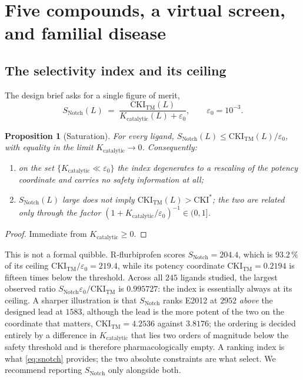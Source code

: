 \documentclass[11pt,reqno]{amsart}
\theoremstyle{plain}
\newtheorem{proposition}[theorem]{Proposition}
\theoremstyle{definition}
\theoremstyle{remark}
\numberwithin{equation}{section}
\newcommand{\CKI}{\mathrm{CKI}}
\newcommand{\Kcat}{K_{\mathrm{catalytic}}}
\newcommand{\CKItm}{\CKI_{\mathrm{TM}}}
\newcommand{\Snotch}{S_{\mathrm{Notch}}}
\begin{document}
\section{Five compounds, a virtual screen, and familial disease}
\label{sec:screen}

\subsection{The selectivity index and its ceiling}
The design brief asks for a single figure of merit,
\begin{equation}
\label{eq:snotch}
\Snotch(L)\;=\;\frac{\CKItm(L)}{\Kcat(L)+\varepsilon_0},\qquad\varepsilon_0=10^{-3}.
\end{equation}

\begin{proposition}[Saturation]
\label{prop:sat}
For every ligand, $\Snotch(L)\le\CKItm(L)/\varepsilon_0$, with equality in the limit $\Kcat\to0$. Consequently:
\begin{enumerate}[label=\textup{(\roman*)},leftmargin=2.2em,itemsep=2pt]
\item on the set $\{\Kcat\ll\varepsilon_0\}$ the index degenerates to a rescaling of the potency coordinate and carries no safety information at all;
\item $\Snotch(L)$ large does not imply $\CKItm(L)>\CKI^\ast$; the two are related only through the factor $(1+\Kcat/\varepsilon_0)^{-1}\in(0,1]$.
\end{enumerate}
\end{proposition}

\begin{proof}
Immediate from $\Kcat\ge0$.
\end{proof}

This is not a formal quibble. R-flurbiprofen scores $\Snotch=204.4$, which is $93.2\,\%$ of its ceiling $\CKItm/\varepsilon_0=219.4$, while its potency coordinate $\CKItm=0.2194$ is fifteen times below the threshold. Across all $245$ ligands studied, the largest observed ratio $\Snotch\varepsilon_0/\CKItm$ is $0.995727$: the index is essentially always at its ceiling. A sharper illustration is that $\Snotch$ ranks E2012 at $2952$ \emph{above} the designed lead at $1583$, although the lead is the more potent of the two on the coordinate that matters, $\CKItm=4.2536$ against $3.8176$; the ordering is decided entirely by a difference in $\Kcat$ that lies two orders of magnitude below the safety threshold and is therefore pharmacologically empty. A ranking index is what \eqref{eq:snotch} provides; the two absolute constraints are what select. We recommend reporting $\Snotch$ only alongside both.
\end{document}
